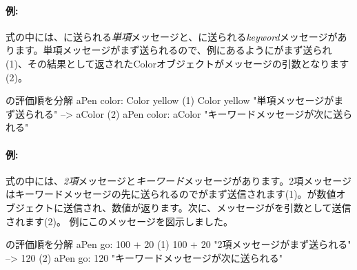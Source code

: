 \documentclass[a4paper,10pt,twoside]{book}
\begin{document}
\paragraph{例:} 式の中には、に送られる\emph{単項}メッセージと、に送られる\emph{keyword}メッセージがあります。単項メッセージがまず送られるので、例にあるようにがまず送られ(1)、その結果として返されたColorオブジェクトがメッセージの引数となります(2)。

\begin{example}[decColor]{の評価順を分解}{}
        aPen color: Color yellow
(1)                       Color yellow        "単項メッセージがまず送られる"
                        --> aColor
(2)   aPen color: aColor                 "キーワードメッセージが次に送られる"
\end{example}

\paragraph{例:} 式の中には、\emph{2項}メッセージと\emph{キーワード}メッセージがあります。2項メッセージはキーワードメッセージの先に送られるのでがまず送信されます(1)。が数値オブジェクトに送信され、数値が返ります。次に、メッセージがを引数として送信されます(2)。
例にこのメッセージを図示しました。

\begin{example}[decGo]{の評価順を分解}{}
      aPen go: 100 + 20   
(1)                 100 + 20           "2項メッセージがまず送られる"
                   -->   120
(2)  aPen go: 120                   "キーワードメッセージが次に送られる"
\end{example}
\end{document}
